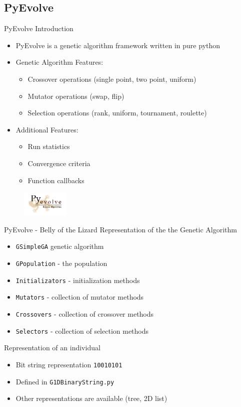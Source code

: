 \documentclass[compress]{beamer}
\begin{document}
\subsection{PyEvolve}
\begin{frame}{PyEvolve Introduction}
	\begin{itemize}
  \small
  \item PyEvolve is a genetic algorithm framework written in pure python
  \item Genetic Algorithm Features:
    \begin{itemize}
      \item Crossover operations (single point, two point, uniform)
      \item Mutator operations (swap, flip)
      \item Selection operations (rank, uniform, tournament, roulette)
    \end{itemize}
  \item Additional Features:
    \begin{itemize}
      \item Run statistics
      \item Convergence criteria
      \item Function callbacks
    \end{itemize}
  \end{itemize}
  \begin{figure}
    \includegraphics[width=0.2\textwidth]{PyEvolveLogo.png}
  \end{figure}
\end{frame}
\begin{frame}{PyEvolve - Belly of the Lizard}
	Representation of the the Genetic Algorithm
  \begin{itemize}
    \item \texttt{GSimpleGA} genetic algorithm
    \item \texttt{GPopulation} - the population
    \item \texttt{Initializators} - initialization methods
    \item \texttt{Mutators} - collection of mutator methods
    \item \texttt{Crossovers} - collection of crossover methods
    \item \texttt{Selectors} - collection of selection methods
  \end{itemize}
  Representation of an individual
  \begin{itemize}
    \item Bit string representation \texttt{10010101}
    \item Defined in \texttt{G1DBinaryString.py}
		\item Other representations are available (tree, 2D list)
  \end{itemize}
\end{frame}
\end{document}
